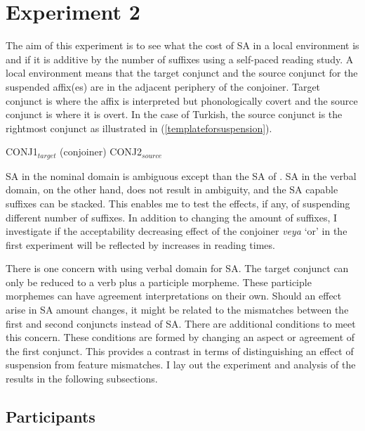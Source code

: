 



\section{Experiment 2}

The aim of this experiment is to see what the cost of SA in a local environment is and if it is additive by the number of suffixes using a self-paced reading study. A local environment means that the target conjunct and the source conjunct for the suspended affix(es) are in the adjacent periphery of the conjoiner. Target conjunct is where the affix is interpreted but phonologically covert and the source conjunct is where it is overt. In the case of Turkish, the source conjunct is the rightmost conjunct as illustrated in (\ref{templateforsuspension}).

\begin{exe}
\ex \label{templateforsuspension}
CONJ1$_{target}$ (conjoiner) CONJ2$_{source}$ 
\end{exe}

SA in the nominal domain is ambiguous except than the SA of {\Case}. SA in the verbal domain, on the other hand, does not result in ambiguity, and the SA capable suffixes can be stacked. This enables me to test the effects, if any, of suspending different number of suffixes. In addition to changing the amount of suffixes, I investigate if the acceptability decreasing effect of the conjoiner \textit{veya} `or' in the first experiment will be reflected by increases in reading times.

There is one concern with using verbal domain for SA. The target conjunct can only be reduced to a verb plus a participle morpheme. These participle morphemes can have {\Tsg} agreement interpretations on their own. Should an effect arise in SA amount changes, it might be related to the mismatches between the first and second conjuncts instead of SA. There are additional conditions to meet this concern. These conditions are formed by changing an aspect or agreement of the first conjunct. This provides a contrast in terms of distinguishing an effect of suspension from feature mismatches. I lay out the experiment and analysis of the results in the following subsections.


\subsection{Participants}

